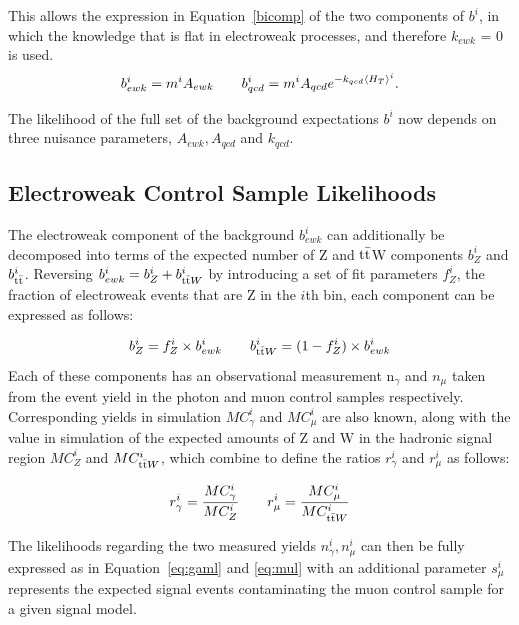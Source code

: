 This allows the expression in Equation~\ref{bicomp} of the two components of $b^{i}$, in which the knowledge that \RaT is flat in electroweak processes, and therefore $k_{ewk}$ = 0 is used.
\begin{equation}
b^{i}_{ewk} = m^{i} A_{ewk} \qquad
b^{i}_{qcd} = m^{i} A_{qcd} e^{-k_{qcd} \langle H_{T}  \rangle^{i}}.
\label{eq:bicomp}
\end{equation}

The likelihood of the full set of the background expectations $b^{i}$ now depends on three nuisance parameters, $A_{ewk}, A_{qcd}$ and $k_{qcd}$. 

\subsection{Electroweak Control Sample Likelihoods}
The electroweak component of the background $b^{i}_{ewk}$ can additionally be decomposed into terms of the expected number of Z and $\textrm{t}\bar{\textrm{t}}$W components $b^{i}_{Z}$ and  $b^{i}_{\textrm{t}\bar{\textrm{t}}}$. Reversing $b^{i}_{ewk} = b^{i}_{Z} + b^{i}_{\textrm{t}\bar{\textrm{t}} W}$ by introducing a set of fit parameters $f^{i}_{Z}$, the fraction of electroweak events that are Z in the $i$th bin, each component can be expressed as follows:

\begin{equation}
b^{i}_{Z}= f^{i}_{Z} \times b^{i}_{ewk} \qquad b^{i}_{\textrm{t}\bar{\textrm{t}} W}= (1 - f^{i}_{Z}) \times b^{i}_{ewk}
\label{eq:ewk1}
\end{equation}
 Each of these components has an observational measurement n$_{\gamma}$ and $n_{\mu}$ taken from the event yield in the photon and muon control samples respectively. Corresponding yields in simulation $MC^{i}_{\gamma}$ and $MC^{i}_{\mu}$ are also known, along with the value in simulation of the expected amounts of Z and \tto W in the hadronic signal region $MC^{i}_{Z}$ and $MC^{i}_{\textrm{t}\bar{\textrm{t}} W}$, which combine to define the ratios $r^{i}_{\gamma}$ and $r^{i}_{\mu}$ as follows:
 
 \begin{equation}
 r^{i}_{\gamma} = \frac{MC^{i}_{\gamma}}{MC^{i}_{Z}} \qquad  r^{i}_{\mu} = \frac{MC^{i}_{\mu}}{MC^{i}_{\textrm{t}\bar{\textrm{t}} W}} 
 \label{eq:ewk2}
 \end{equation}

The likelihoods regarding the two measured yields $n^{i}_{\gamma}, n^{i}_{\mu}$ can then be fully expressed as in Equation~\ref{eq:gaml} and \ref{eq:mul} with an additional parameter $s^{i}_{\mu}$ represents the expected signal events contaminating the muon control sample for a given signal model. 

